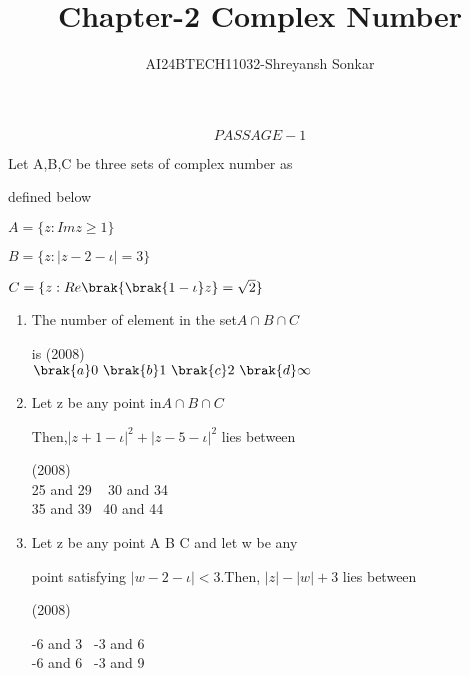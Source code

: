 \documentclass[journal,12pt,twocolumn]{IEEEtran}
\theoremstyle{remark}
\begin{document}

\vspace{3cm}

\title{Chapter-2 Complex Number}
\author{AI24BTECH11032-Shreyansh Sonkar
}
\maketitle
\newpage
\bigskip

\renewcommand{\thefigure}{\theenumi}
\renewcommand{\thetable}{\theenumi}
$$PASSAGE-1$$

    


 Let A,B,C be three sets of complex number as 
 
 defined below

$A=\{z:Im z\geq 1\}$

$B=\{z:|z-2-\iota|=3\}$

$C=\{z:Re\brak{\brak{1-\iota}z}=\sqrt{2}\}$
\begin{enumerate}
    

\item The number of element in the set$ A \cap B \cap C $

is \hfill (2008)\\

$\brak{a} 0 \ \brak{b} 1 \  \brak{c} 2 \ \brak{d}\infty \ $ \\

\item Let z be any point in$ A\cap B \cap C$

 Then,$|z+1-\iota|^2+|z-5-\iota|^2$ lies between
 
 \hfill  (2008) \\
             
 
   25 and 29 \   30 and 34\\
 
  35 and 39 \  40 and 44 \\

\item  Let z be any point A B C and let w be any

point satisfying $|w-2-\iota|<3$.Then, $|z|-|w|+3$ lies between
   
   \hfill (2008)

  -6 and 3\    -3 and 6 \\

  -6 and 6\    -3 and 9\\
 \end{enumerate}

 
\end{document}
